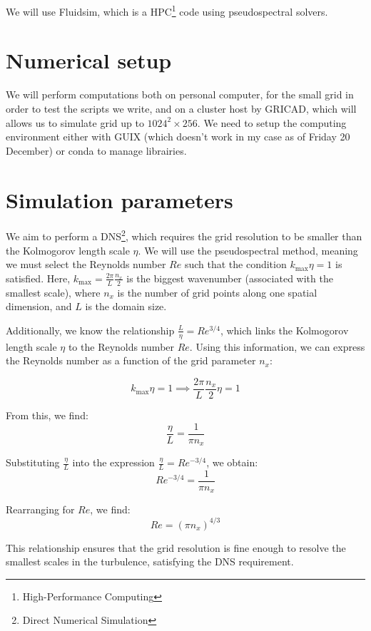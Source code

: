 We will use Fluidsim\cite{fluiddyn}, which is a HPC\footnote{High-Performance Computing} code using pseudospectral solvers.

\section{Numerical setup}
We will perform computations both on personal computer, for the small grid in order to test the scripts we write, and on a cluster host by GRICAD, which will allows us to simulate grid up to $1024^2 \times 256$. We need to setup the computing environment either with GUIX (which doesn't work in my case as of Friday 20 December) or conda to manage librairies. 

\section{Simulation parameters}
We aim to perform a DNS\footnote{Direct Numerical Simulation}, which requires the grid resolution to be smaller than the Kolmogorov length scale $\eta$. We will use the pseudospectral method, meaning we must select the Reynolds number $Re$ such that the condition $k_{\text{max}} \eta = 1$ is satisfied. Here, $k_{\text{max}} = \frac{2\pi}{L} \frac{n_x}{2}$ is the biggest wavenumber (associated with the smallest scale), where $n_x$ is the number of grid points along one spatial dimension, and $L$ is the domain size.

Additionally, we know the relationship $\frac{L}{\eta} = Re^{3/4}$, which links the Kolmogorov length scale $\eta$ to the Reynolds number $Re$. Using this information, we can express the Reynolds number as a function of the grid parameter $n_x$:

\begin{equation*}
k_{\text{max}} \eta = 1 \implies \frac{2\pi}{L} \frac{n_x}{2} \eta = 1
\end{equation*}

From this, we find:
\begin{equation*}
\frac{\eta}{L} = \frac{1}{\pi n_x}
\end{equation*}

Substituting $\frac{\eta}{L}$ into the expression $\frac{\eta}{L} = Re^{-3/4}$, we obtain:
\begin{equation*}
Re^{-3/4} = \frac{1}{\pi n_x}
\end{equation*}

Rearranging for $Re$, we find:
\begin{equation}
Re = \left( \pi n_x \right)^{4/3}
\end{equation}

This relationship ensures that the grid resolution is fine enough to resolve the smallest scales in the turbulence, satisfying the DNS requirement.